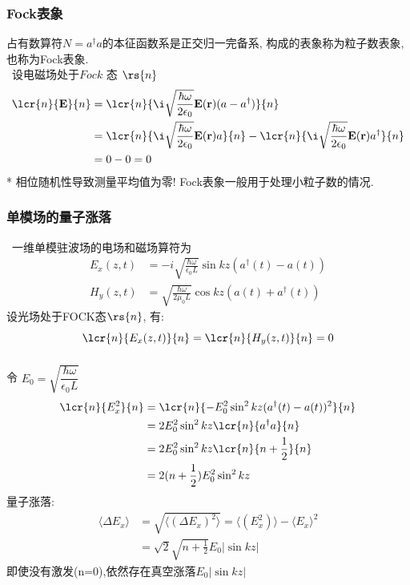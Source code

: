\begin{frame}
    \frametitle{Fock表象}
    占有数算符$N=a^\dagger a $的本征函数系是正交归一完备系, 构成的表象称为粒子数表象,也称为Fock表象. \\
    \证~设电磁场处于$Fock$ 态 $\rs{n}$
    \[ 
      \begin{aligned}
        \lcr{n}{\mathbf{E}}{n} &= \lcr{n}{\i \sqrt{\frac{\hbar\omega}{2 \epsilon_0}} \mathbf{E}( \mathbf{r}) (a - a^\dagger) }{n}   \\ 
        &= \lcr{n}{\i \sqrt{\frac{\hbar\omega}{2 \epsilon_0}} \mathbf{E}( \mathbf{r})a }{n} - \lcr{n}{\i \sqrt{\frac{\hbar\omega}{2 \epsilon_0}} \mathbf{E}( \mathbf{r})a^\dagger }{n}  \\ 
        &= 0-0 =0 
      \end{aligned}
      \]   
      * 相位随机性导致测量平均值为零! Fock表象一般用于处理小粒子数的情况. 
\end{frame}

\begin{frame}
    \frametitle{单模场的量子涨落}
    \解~一维单模驻波场的电场和磁场算符为  
    \[ \begin{aligned}
      E_x(z,t)
      &= -i \sqrt{\frac{\hbar\omega}{\epsilon_0 L}} \sin kz (a^\dagger(t)-a(t) ) \\ 
      H_y(z,t)  
      &= \sqrt{\frac{\hbar\omega}{2 \mu_0 L}} \cos kz (a(t) + a^\dagger(t))
   \end{aligned} \]
   设光场处于FOCK态$\rs{n}$, 有:
   \[ \lcr{n}{E_x(z,t)}{n} = \lcr{n}{H_y(z,t)}{n} =0\]
\end{frame}

\begin{frame}
    \frametitle{}
    令 $E_0= \sqrt{\dfrac{\hbar\omega}{\epsilon_0 L}}$
    \[ \begin{aligned}
      \lcr{n}{E^2_x}{n} &= \lcr{n}{-E^2_0 \sin^2 kz (a^\dagger(t)-a(t))^2}{n} \\
      &= 2 E^2_0 \sin^2 kz \lcr{n}{a^\dagger a}{n} \\ 
      &= 2 E^2_0 \sin^2 kz \lcr{n}{n+\frac{1}{2}}{n} \\ 
      &= 2 (n+\frac{1}{2})E^2_0 \sin^2 kz  
   \end{aligned} \]
   量子涨落: 
   \[
  \begin{aligned}
         \langle \Delta E_x\rangle &= \sqrt{\langle (\Delta E_x)^2\rangle} = \langle (E^2_x)\rangle - \langle E_x\rangle ^2 \\
         &= \sqrt{2} \sqrt{n+\frac{1}{2}} E_0 \left|\sin kz \right| 
  \end{aligned} \]
  即使没有激发(n=0),依然存在真空涨落$ E_0 \left|\sin kz \right|  $  
\end{frame}

